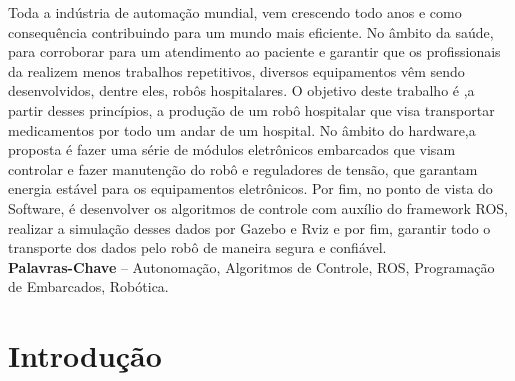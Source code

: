 \documentclass[]{politex}
\begin{document}
\begin{resumo}
Toda a indústria de automação mundial, vem crescendo todo anos e como consequência contribuindo para um mundo mais eficiente. No âmbito da saúde, para corroborar para um atendimento ao paciente e garantir que os profissionais da realizem menos trabalhos repetitivos, diversos equipamentos vêm sendo desenvolvidos, dentre eles, robôs hospitalares. O objetivo deste trabalho é ,a partir desses princípios, a produção de um robô hospitalar que visa transportar medicamentos por todo um andar de um hospital. No âmbito do hardware,a proposta é fazer uma série de módulos eletrônicos embarcados que visam controlar e fazer manutenção do robô e reguladores de tensão, que garantam energia estável para os equipamentos eletrônicos. Por fim, no ponto de vista do Software, é desenvolver os algoritmos de controle com auxílio do framework ROS, realizar a simulação desses dados por Gazebo e Rviz e por fim, garantir todo o transporte dos dados pelo robô de maneira segura e confiável.
%
\\[3\baselineskip]
%
\textbf{Palavras-Chave} -- Autonomação, Algoritmos de Controle, ROS, Programação de Embarcados, Robótica.
\end{resumo}

\begin{comment}

\begin{abstract}
Abstract...
%
\\[3\baselineskip]
%
\textbf{Keywords} -- Word, Word, Word, Word, Word.
\end{abstract}
\end{comment}
\listadefiguras
\listadetabelas

\sumario


\part{Introdução}



\end{document}
